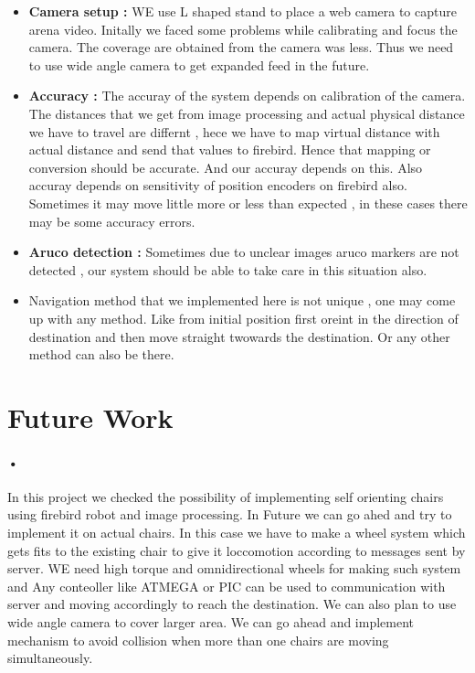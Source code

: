 \documentclass[]{exam}
\begin{document}
\begin{itemize}
\item \textbf{Camera setup :} WE use L shaped stand to place a web camera to capture arena video. Initally we faced some problems while calibrating and focus the camera. The coverage are obtained from the camera was less. Thus we need to use wide angle camera to get expanded feed in the future. 
\item \textbf{Accuracy : } The accuray of the system depends on calibration of the camera. The distances that we get from image processing and actual physical distance we have to travel are differnt , hece we have to map virtual distance with actual distance and send that values to firebird. Hence that mapping or conversion should be accurate. And our accuray depends on this. Also accuray depends on sensitivity of position encoders on firebird also. Sometimes it may move little more or less than expected , in these cases there may be some accuracy errors. 
\item \textbf{Aruco detection : } Sometimes due to unclear images aruco markers are not detected , our system should be able to take care in this situation also.
\item Navigation method that we implemented here is not unique , one may come up with any method. Like from initial position first oreint in the direction of destination and then move straight twowards the destination. Or any other method can also be there. 
\end{itemize}

\section{\color{red} Future Work  }
\paragraph{•}
In this project we checked the possibility of implementing self orienting chairs using firebird robot and image processing. In Future we can go ahed and try to implement it on actual chairs. In this case we have to make a wheel system which gets fits to the existing chair to give it loccomotion according to messages sent by server. WE need high torque and omnidirectional wheels for making such system and Any conteoller like ATMEGA or PIC can be used to communication with server and moving accordingly  to reach the destination. We can also plan to use wide angle camera to cover larger area. We can go ahead and implement mechanism to avoid collision when more than one chairs are moving simultaneously. 
\end{document}
